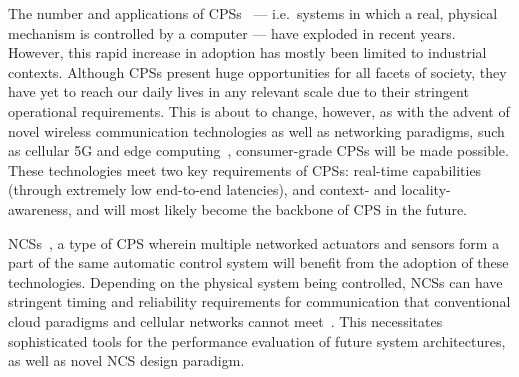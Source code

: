 The number and applications of \acp{CPS}~\cite{Rajkumar2010CPS} --- i.e.\ systems in which a real, physical mechanism is controlled by a computer --- have exploded in recent years.
However, this rapid increase in adoption has mostly been limited to industrial contexts.
Although \acp{CPS} present huge opportunities for all facets of society, they have yet to reach our daily lives in any relevant scale due to their stringent operational requirements.
This is about to change, however, as with the advent of novel wireless communication technologies as well as networking paradigms, such as cellular 5G and edge computing~\cite{Satya2017Emergence}, consumer-grade \acp{CPS} will be made possible.
These technologies meet two key requirements of \acp{CPS}: real-time capabilities (through extremely low end-to-end latencies), and context- and locality-awareness, and will most likely become the backbone of \ac{CPS} in the future.

\acp{NCS}~\cite{Gupta2010NCSOverview}, a type of \ac{CPS} wherein multiple networked actuators and sensors form a part of the same automatic control system will benefit from the adoption of these technologies.
Depending on the physical system being controlled, \acp{NCS} can have stringent timing and reliability requirements for communication that conventional cloud paradigms and cellular networks cannot meet~\cite{Wan2020Efficient}.
This necessitates sophisticated tools for the performance evaluation of future system architectures, as well as novel NCS design paradigm.


